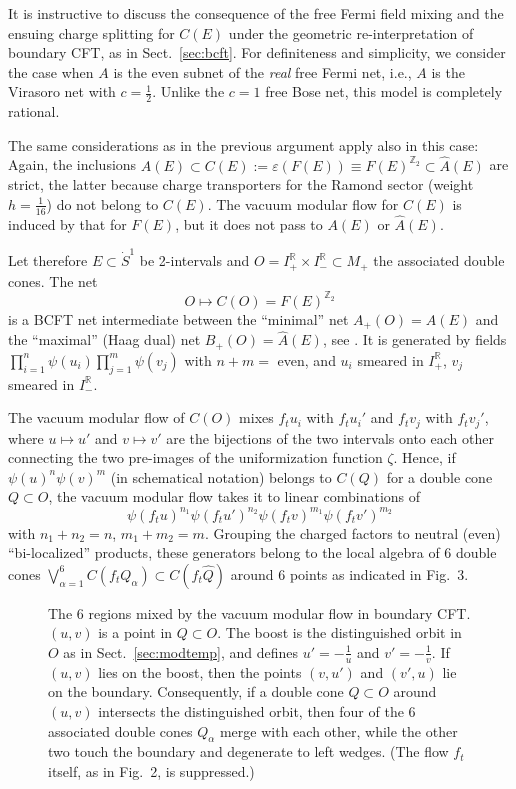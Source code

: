 \documentclass[12pt]{article}
\def\eps{\varepsilon}
\def \RR {{\mathbb R}}
\def \ZZ {{\mathbb Z}}
\def \Sdot {\dot S^1}
\def\be{\begin{equation}} \def\bea{\begin{eqnarray}}
\def\ee{\end{equation}}\def\ea{\end{array}}
\begin{document}
\medskip


It is instructive to discuss the consequence of the free Fermi
field mixing and the ensuing charge splitting for $C(E)$ under the
geometric re-interpreta\-tion of boundary CFT, as in Sect.\ \ref{sec:bcft}. 
For definiteness and simplicity, we consider the case when $A$ is the
even subnet of the {\em real}\/ free Fermi net, i.e., $A$ is the
Virasoro net with $c=\frac 12$. Unlike the $c=1$ free Bose net, this
model is completely rational. 

The same considerations as in the previous argument
apply also in this case: Again, the inclusions $A(E)\subset
C(E):=\eps(F(E))\equiv F(E)^{\ZZ_2} \subset \widehat A(E)$ are strict,
the latter because charge transporters for the Ramond sector (weight
$h=\frac1{16}$) do not belong to $C(E)$. The vacuum modular flow for
$C(E)$ is induced by that for $F(E)$, but it does not pass to $A(E)$
or $\widehat A(E)$.  


Let therefore $E\subset \Sdot$ be 2-intervals and 
$O=I^\RR_+\times I^\RR_-\subset M_+$ the associated double cones. The
net 
\be
  O\mapsto C(O) =F(E)^{\ZZ_2}
\ee
is a BCFT net intermediate between the ``minimal'' net $A_+(O)=A(E)$
and the ``maximal'' (Haag dual) net $B_+(O)=\widehat A(E)$, see \cite{LR04}. 
It is generated by fields
$\prod_{i=1}^n\psi(u_i)\prod_{j=1}^m\psi(v_j)$ with $n+m=$ even, and
$u_i$ smeared in $I^\RR_+$, $v_j$ smeared in $I^\RR_-$. 

The vacuum modular flow of $C(O)$ mixes $f_tu_i$ with $f_tu_i'$ and
$f_tv_j$ with $f_tv_j'$, where $u\mapsto u'$ and $v\mapsto v'$ are the 
bijections of the two intervals onto each other connecting the two
pre-images of the uniformization function $\zeta$. Hence, if
$\psi(u)^n\psi(v)^m$ (in schematical notation) belongs to $C(Q)$ for a
double cone $Q\subset O$, the vacuum modular flow takes it to linear
combinations of  
\be
  \psi(f_tu)^{n_1}\psi(f_tu')^{n_2}\psi(f_tv)^{m_1}\psi(f_tv')^{m_2}
\ee
with $n_1+n_2=n$, $m_1+m_2=m$. Grouping the charged factors to neutral
(even) ``bi-localized'' products, these generators belong to the local
algebra of 6 double cones $\bigvee_{\alpha=1}^6 C(f_tQ_\alpha)\subset
C(f_t\widehat Q)$ around 6 points as indicated in Fig.\ 3.  

\begin{figure}[htb*]

\hskip45mm  

\caption {\small The 6 regions mixed by the vacuum modular flow in
  boundary CFT. $(u,v)$ is a point in $Q\subset O$. The boost is the
  distinguished orbit in $O$ as in Sect.\ \ref{sec:modtemp}, and
  defines $u'=-\frac 1u$ and $v'=-\frac 1v$. If $(u,v)$ lies on the
  boost, then the points $(v,u')$ and $(v',u)$ lie on the
  boundary. Consequently, if a double cone $Q\subset O$ around $(u,v)$
  intersects the distinguished orbit, then four of the 6 associated
  double cones $Q_\alpha$ merge with each other, while the other two
  touch the boundary and degenerate to left wedges. (The flow $f_t$
  itself, as in Fig.\ 2, is suppressed.) }    

\end{figure}
\end{document}
